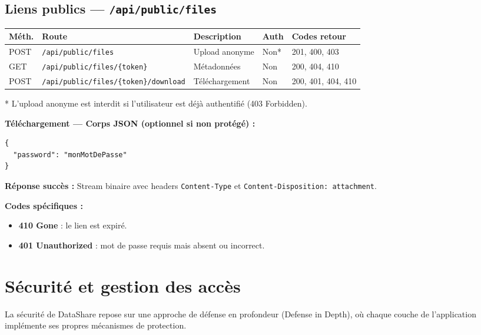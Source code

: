 \documentclass[12pt,a4paper]{article}
\begin{document}
\subsection{Liens publics --- \texttt{/api/public/files}}

\begin{longtable}{p{1.2cm} p{4.8cm} p{3cm} p{1cm} p{3.5cm}}
\toprule
\textbf{M\'eth.} & \textbf{Route} & \textbf{Description} & \textbf{Auth} & \textbf{Codes retour} \\
\midrule
\endhead
POST & \texttt{/api/public/files} & Upload anonyme & Non* & 201, 400, 403 \\
GET & \texttt{/api/public/files/\{token\}} & M\'etadonn\'ees & Non & 200, 404, 410 \\
POST & \texttt{/api/public/files/\{token\}/download} & T\'el\'echargement & Non & 200, 401, 404, 410 \\
\bottomrule
\end{longtable}

\small{* L'upload anonyme est interdit si l'utilisateur est d\'ej\`a authentifi\'e (403 Forbidden).}

\normalsize

\textbf{T\'el\'echargement --- Corps JSON (optionnel si non prot\'eg\'e) :}
\begin{lstlisting}
{
  "password": "monMotDePasse"
}
\end{lstlisting}

\textbf{R\'eponse succ\`es :} Stream binaire avec headers \texttt{Content-Type} et \texttt{Content-Disposition: attachment}.

\textbf{Codes sp\'ecifiques :}
\begin{itemize}[nosep]
  \item \textbf{410 Gone} : le lien est expir\'e.
  \item \textbf{401 Unauthorized} : mot de passe requis mais absent ou incorrect.
\end{itemize}

\section{S\'ecurit\'e et gestion des acc\`es}

La s\'ecurit\'e de DataShare repose sur une approche de d\'efense en profondeur (Defense in Depth), o\`u chaque couche de l'application impl\'emente ses propres m\'ecanismes de protection.
\end{document}
